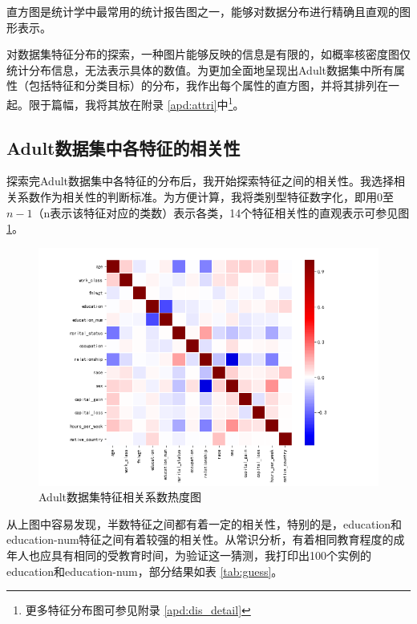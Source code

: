 \documentclass[12pt,a4paper]{article}
\theoremstyle{definition}
\begin{document}
直方图是统计学中最常用的统计报告图之一，能够对数据分布进行精确且直观的图形表示。

\vspace{0.01\linewidth}
对数据集特征分布的探索，一种图片能够反映的信息是有限的，如概率核密度图仅统计分布信息，无法表示具体的数值。为更加全面地呈现出Adult数据集中所有属性（包括特征和分类目标）的分布，我作出每个属性的直方图，并将其排列在一起。限于篇幅，我将其放在附录 \ref{apd:attri}中\footnote{更多特征分布图可参见附录 \ref{apd:dis_detail}}。

\subsection{Adult数据集中各特征的相关性}
\label{sec:cof}

探索完Adult数据集中各特征的分布后，我开始探索特征之间的相关性。我选择相关系数作为相关性的判断标准。为方便计算，我将类别型特征数字化，即用0至$n-1$（n表示该特征对应的类数）表示各类，14个特征相关性的直观表示可参见图 \ref{fig:heat}。

\begin{figure}[H]
	\centering
	\includegraphics[width=0.85\linewidth]{img/cof_heat.png}
	\caption{Adult数据集特征相关系数热度图}
	\label{fig:heat}
\end{figure}

从上图中容易发现，半数特征之间都有着一定的相关性，特别的是，education和education-num特征之间有着较强的相关性。从常识分析，有着相同教育程度的成年人也应具有相同的受教育时间，为验证这一猜测，我打印出100个实例的education和education-num，部分结果如表 \ref{tab:guess}。
\end{document}
